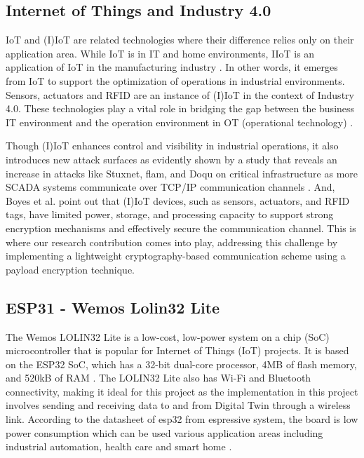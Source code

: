
\subsection{Internet of Things and Industry 4.0 }
IoT and (I)IoT are related technologies where their difference relies only on their application area. While IoT is in IT and home environments,  IIoT is an application of IoT in the manufacturing industry \cite{boyes_industrial_2018}. In other words, it emerges from IoT \cite{fuller_digital_2020} to support the optimization of operations in industrial environments. Sensors, actuators and RFID are an instance of (I)IoT in the context of Industry 4.0. These technologies play a vital role in bridging the gap between the business IT environment and the operation environment in OT (operational technology) \cite{adrienbacueDigitalTwinsEnhanced2022}.


Though (I)IoT enhances control and visibility in industrial operations, it also introduces new attack surfaces as evidently shown by a study that reveals an increase in attacks like Stuxnet, flam, and Doqu on critical infrastructure as more SCADA systems communicate over TCP/IP communication channels \cite{eden_scada_2017}. And, Boyes et al. \cite{boyes_industrial_2018} point out that (I)IoT devices, such as sensors, actuators, and RFID tags, have limited power, storage, and processing capacity to support strong encryption mechanisms and effectively secure the communication channel. This is where our research contribution comes into play, addressing this challenge by implementing a lightweight cryptography-based communication scheme using a payload encryption technique.

\subsection{ESP31 - Wemos Lolin32 Lite}

The Wemos LOLIN32 Lite is a low-cost, low-power system on a chip (SoC)  microcontroller that is popular for Internet of Things (IoT) projects. It is based on the ESP32 SoC, which has a 32-bit dual-core processor, 4MB of flash memory, and 520kB of RAM \cite{noauthor_espressif_systems_01292021_esp32-1991551pdf_nodate}. The LOLIN32 Lite also has Wi-Fi and Bluetooth connectivity, making it ideal for this project as the implementation in this project involves sending and receiving data to and from Digital Twin through a wireless link. According to the datasheet of esp32 from espressive system, the board is low power consumption which can be used various application areas including industrial automation, health care and smart home \cite{noauthor_espressif_systems_01292021_esp32-1991551pdf_nodate}. 

